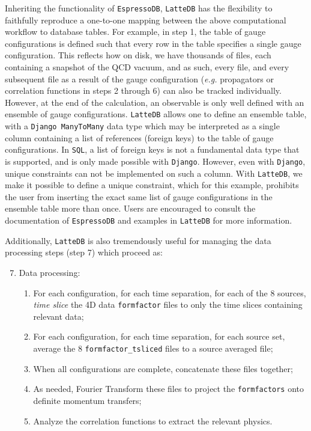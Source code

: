 Inheriting the functionality of \texttt{EspressoDB}, \texttt{LatteDB}
has the flexibility to faithfully reproduce a one-to-one mapping between
the above computational workflow to database tables. For example, in
step 1, the table of gauge configurations is defined such that every row
in the table specifies a single gauge configuration. This reflects how
on disk, we have thousands of files, each containing a snapshot of the
QCD vacuum, and as such, every file, and every subsequent file as a
result of the gauge configuration (\emph{e.g.} propagators or
correlation functions in steps 2 through 6) can also be tracked
individually. However, at the end of the calculation, an observable is
only well defined with an ensemble of gauge configurations.
\texttt{LatteDB} allows one to define an ensemble table, with a
\texttt{Django\ ManyToMany} data type which may be interpreted as a
single column containing a list of references (foreign keys) to the
table of gauge configurations. In \texttt{SQL}, a list of foreign keys
is not a fundamental data type that is supported, and is only made
possible with \texttt{Django}. However, even with \texttt{Django},
unique constraints can not be implemented on such a column. With
\texttt{LatteDB}, we make it possible to define a unique constraint,
which for this example, prohibits the user from inserting the exact same
list of gauge configurations in the ensemble table more than once. Users
are encouraged to consult the documentation of \texttt{EspressoDB} and
examples in \texttt{LatteDB} for more information.

Additionally, \texttt{LatteDB} is also tremendously useful for managing
the data processing steps (step 7) which proceed as:

\begin{enumerate}
\setcounter{enumi}{6}\item Data processing:
\begin{enumerate}
\item For each configuration, for each time separation, for each of the 8 sources, \emph{time slice} the 4D data \texttt{formfactor} files to only the time slices containing relevant data;

\item For each configuration, for each time separation, for each source set, average the 8 \texttt{formfactor\_tsliced} files to a source averaged file;

\item When all configurations are complete, concatenate these files together;

\item As needed, Fourier Transform these files to project the \texttt{formfactors} onto definite momentum transfers;

\item Analyze the correlation functions to extract the relevant physics.
\end{enumerate}
\end{enumerate}


